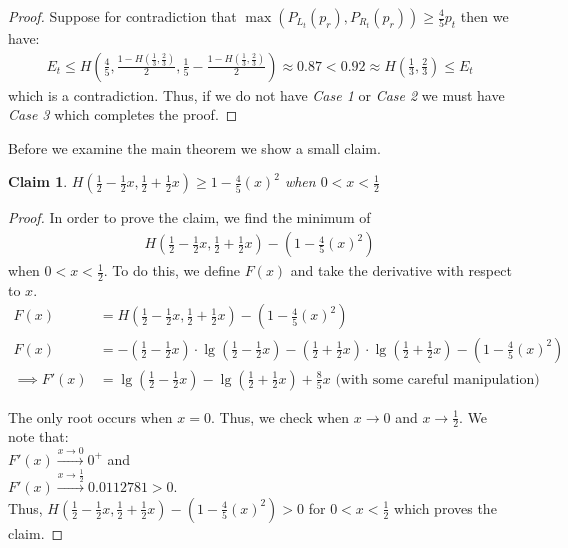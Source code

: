 \documentclass[]{beamer}
\theoremstyle{plain}
\begin{document}
\begin{frame}
\begin{proof}
Suppose for contradiction that $\max(P_{L_t}(p_r), P_{R_t}(p_r)) \geq \frac{4}{5} p_t$ then we have:
\begin{align*}
E_t \leq H(\frac{4}{5}, \frac{1-H(\frac{1}{3}, \frac{2}{3})}{2}, \frac{1}{5}-\frac{1-H(\frac{1}{3}, \frac{2}{3})}{2}) \approx 0.87 < 0.92 \approx H(\frac{1}{3}, \frac{2}{3}) \leq E_t
\end{align*}
which is a contradiction.
Thus, if we do not have \textit{Case 1} or \textit{Case 2} we must have \textit{Case 3} which completes the proof.



\end{proof}

Before we examine the main theorem we show a small claim.

\newtheorem{claim}{Claim}
\begin{claim}\label{Claim1}
$H(\frac{1}{2}-\frac{1}{2} x, \frac{1}{2} + \frac{1}{2} x) \geq 1- \frac{4}{5} (x)^2$ when $0 < x < \frac{1}{2}$
\end{claim}

\begin{proof}
In order to prove the claim, we find the minimum of
\begin{align*}
H(\frac{1}{2}-\frac{1}{2} x, \frac{1}{2} + \frac{1}{2} x) - (1 - \frac{4}{5} (x)^2) 
\end{align*}
when $0 < x < \frac{1}{2}$. To do this, we define $F(x)$ and take the derivative with respect to $x$.
\begin{align*}
F(x) &= H(\frac{1}{2}-\frac{1}{2} x, \frac{1}{2} + \frac{1}{2} x) - (1 - \frac{4}{5} (x)^2) \\
F(x) &= - (\frac{1}{2}-\frac{1}{2} x)\cdot \lg(\frac{1}{2}-\frac{1}{2} x) - (\frac{1}{2} + \frac{1}{2} x)\cdot\lg(\frac{1}{2} + \frac{1}{2} x) - (1 - \frac{4}{5} (x)^2) \\
\implies F'(x) &= \lg(\frac{1}{2}-\frac{1}{2} x) - \lg(\frac{1}{2} + \frac{1}{2} x) + \frac{8}{5}x \text{ (with some careful manipulation)}
\end{align*}

The only root occurs when $x = 0$. Thus, we check when $x \rightarrow 0$ and $x \rightarrow \frac{1}{2}$. We note that: \\
$F'(x) \xrightarrow{x \to 0} 0^{+}$ and \\
$F'(x) \xrightarrow{x \to \frac{1}{2}} 0.0112781 > 0$. \\
Thus, $H(\frac{1}{2}-\frac{1}{2} x, \frac{1}{2} + \frac{1}{2} x) - (1 - \frac{4}{5} (x)^2) > 0$ for $ 0 < x < \frac{1}{2}$ which proves the claim.
\end{proof} 



\end{frame}
\end{document}
